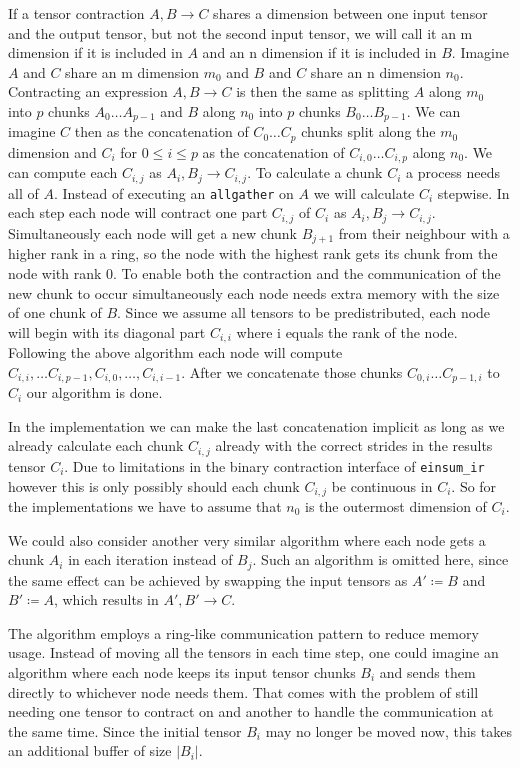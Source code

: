 If a tensor contraction $A,B \rightarrow C$ shares a dimension between one input tensor and the output tensor, but not the second input tensor, we will call it an m dimension if it is included in $A$ and an n dimension if it is included in $B$.
Imagine $A$ and $C$ share an m dimension $m_0$ and $B$ and $C$ share an n dimension $n_0$.
Contracting an expression $A,B \rightarrow C$ is then the same as splitting $A$ along $m_0$ into $p$ chunks $A_0\dots A_{p-1}$ and $B$ along $n_0$ into $p$ chunks $B_0\dots B_{p-1}$.
We can imagine $C$ then as the concatenation of $C_0\dots C_p$ chunks split along the $m_0$ dimension and $C_i$ for $0 \leq i \leq p$ as the concatenation of $C_{i,0} \dots C_{i,p}$ along $n_0$.
We can compute each $C_{i,j}$ as $A_i,B_j \rightarrow C_{i,j}$.
To calculate a chunk $C_i$ a process needs all of $A$.
Instead of executing an \texttt{allgather} on $A$ we will calculate $C_i$ stepwise.
In each step each node will contract one part $C_{i,j}$ of $C_i$ as $A_i,B_j \rightarrow C_{i,j}$.
Simultaneously each node will get a new chunk $B_{j+1}$ from their neighbour with a higher rank in a ring, so the node with the highest rank gets its chunk from the node with rank 0.
To enable both the contraction and the communication of the new chunk to occur simultaneously each node needs extra memory with the size of one chunk of $B$.
Since we assume all tensors to be predistributed, each node will begin with its diagonal part $C_{i,i}$ where i equals the rank of the node.
Following the above algorithm each node will compute $C_{i,i}, \dots C_{i,p-1},C_{i,0},\dots,C_{i,i-1}$.
After we concatenate those chunks $C_{0,i}\dots C_{p-1,i}$ to $C_i$ our algorithm is done.

In the implementation we can make the last concatenation implicit as long as we already calculate each chunk $C_{i,j}$ already with the correct strides in the results tensor $C_i$.
Due to limitations in the binary contraction interface of \texttt{einsum\_ir} however this is only possibly should each chunk $C_{i,j}$ be continuous in $C_i$.
So for the implementations we have to assume that $n_0$ is the outermost dimension of $C_i$.

We could also consider another very similar algorithm where each node gets a chunk $A_i$ in each iteration instead of $B_j$.
Such an algorithm is omitted here, since the same effect can be achieved by swapping the input tensors as $A' \coloneqq B$ and $B' \coloneqq A$, which results in $A',B' \rightarrow C$.

The algorithm employs a ring-like communication pattern to reduce memory usage.
Instead of moving all the tensors in each time step, one could imagine an algorithm where each node keeps its input tensor chunks $B_i$ and sends them directly to whichever node needs them.
That comes with the problem of still needing one tensor to contract on and another to handle the communication at the same time.
Since the initial tensor $B_i$ may no longer be moved now, this takes an additional buffer of size $|B_i|$.

